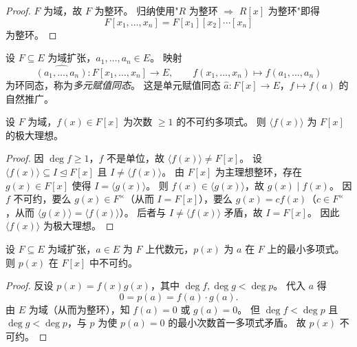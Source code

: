 \documentclass[lang=cn,a4paper,newtx]{elegantbook}
\begin{document}
\begin{proof}
  $F$ 为域，故 $F$ 为整环。
  归纳使用"$R$ 为整环 $\Rightarrow$ $R[x]$ 为整环"即得
  \[
    F[x_1,\dots,x_n]=F[x_1][x_2]\cdots[x_n]
  \]
  为整环。
\end{proof}

\begin{remark}
  设 $F\subseteq E$ 为域扩张，$a_1,\dots,a_n\in E$。
  映射
  \[
    \widehat{(a_1,\dots,a_n)}\colon F[x_1,\dots,x_n]\to E,\qquad f(x_1,\dots,x_n)\mapsto f(a_1,\dots,a_n)
  \]
  为环同态，称为\emph{多元赋值同态}。
  这是单元赋值同态 $\hat a\colon F[x]\to E$，$f\mapsto f(a)$ 的自然推广。
\end{remark}

\begin{proposition}
  设 $F$ 为域，$f(x)\in F[x]$ 为次数 $\ge 1$ 的不可约多项式。
  则 $\langle f(x)\rangle$ 为 $F[x]$ 的极大理想。
\end{proposition}

\begin{proof}
  因 $\deg f\ge 1$，$f$ 不是单位，故 $\langle f(x)\rangle\ne F[x]$。
  设 $\langle f(x)\rangle\subseteq I\trianglelefteq F[x]$ 且 $I\ne\langle f(x)\rangle$。
  由 $F[x]$ 为主理想整环，存在 $g(x)\in F[x]$ 使得 $I=\langle g(x)\rangle$。
  则 $f(x)\in\langle g(x)\rangle$，故 $g(x)\mid f(x)$。
  因 $f$ 不可约，要么 $g(x)\in F^{\times}$（从而 $I=F[x]$），要么 $g(x)=cf(x)$（$c\in F^{\times}$，从而 $\langle g(x)\rangle=\langle f(x)\rangle$）。
  后者与 $I\ne\langle f(x)\rangle$ 矛盾，故 $I=F[x]$。
  因此 $\langle f(x)\rangle$ 为极大理想。
\end{proof}

\begin{proposition}
  设 $F\subseteq E$ 为域扩张，$a\in E$ 为 $F$ 上代数元，$p(x)$ 为 $a$ 在 $F$ 上的最小多项式。
  则 $p(x)$ 在 $F[x]$ 中不可约。
\end{proposition}

\begin{proof}
  反设 $p(x)=f(x)g(x)$，其中 $\deg f,\deg g<\deg p$。
  代入 $a$ 得
  \[
    0=p(a)=f(a)\cdot g(a).
  \]
  由 $E$ 为域（从而为整环），知 $f(a)=0$ 或 $g(a)=0$。
  但 $\deg f<\deg p$ 且 $\deg g<\deg p$，与 $p$ 为使 $p(a)=0$ 的最小次数首一多项式矛盾。
  故 $p(x)$ 不可约。
\end{proof}
\end{document}
